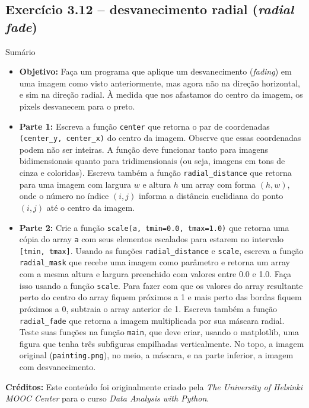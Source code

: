 \documentclass[11pt,a4paper]{article}
\begin{document}
\subsection*{Exercício 3.12 -- desvanecimento radial (\textit{radial fade})}

\begin{exercicio}{Sumário}
\begin{itemize}
    \item \textbf{Objetivo:} Faça um programa que aplique um desvanecimento (\textit{fading}) em uma imagem como visto anteriormente, mas agora não na direção horizontal, e sim na direção radial. À medida que nos afastamos do centro da imagem, os pixels desvanecem para o preto.
    \item \textbf{Parte 1:} Escreva a função \texttt{center} que retorna o par de coordenadas \texttt{(center\_y, center\_x)} do centro da imagem. Observe que essas coordenadas podem não ser inteiras. A função deve funcionar tanto para imagens bidimensionais quanto para tridimensionais (ou seja, imagens em tons de cinza e coloridas). Escreva também a função \texttt{radial\_distance} que retorna para uma imagem com largura $w$ e altura $h$ um array com forma $(h,w)$, onde o número no índice $(i,j)$ informa a distância euclidiana do ponto $(i,j)$ até o centro da imagem.
    \item \textbf{Parte 2:} Crie a função \texttt{scale(a, tmin=0.0, tmax=1.0)} que retorna uma cópia do array \texttt{a} com seus elementos escalados para estarem no intervalo \texttt{[tmin, tmax]}. Usando as funções \texttt{radial\_distance} e \texttt{scale}, escreva a função \texttt{radial\_mask} que recebe uma imagem como parâmetro e retorna um array com a mesma altura e largura preenchido com valores entre 0.0 e 1.0. Faça isso usando a função \texttt{scale}. Para fazer com que os valores do array resultante perto do centro do array fiquem próximos a 1 e mais perto das bordas fiquem próximos a 0, subtraia o array anterior de 1. Escreva também a função \texttt{radial\_fade} que retorna a imagem multiplicada por sua máscara radial. Teste suas funções na função \texttt{main}, que deve criar, usando o matplotlib, uma figura que tenha três subfiguras empilhadas verticalmente. No topo, a imagem original (\texttt{painting.png}), no meio, a máscara, e na parte inferior, a imagem com desvanecimento.
\end{itemize}
\end{exercicio}

\vspace{2em}
\noindent\textbf{Créditos:} Este conteúdo foi originalmente criado pela \textit{The University of Helsinki MOOC Center} para o curso \textit{Data Analysis with Python}.
\end{document}
